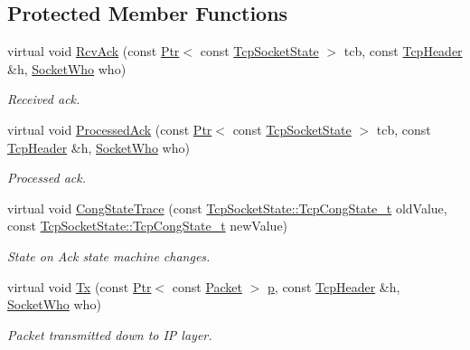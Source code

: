 \subsection*{Protected Member Functions}
\begin{DoxyCompactItemize}
\item 
virtual void \hyperlink{classTcpFastRetrTest_a43e2a765fc73bc35810a5773bf811b90}{Rcv\+Ack} (const \hyperlink{classns3_1_1Ptr}{Ptr}$<$ const \hyperlink{classns3_1_1TcpSocketState}{Tcp\+Socket\+State} $>$ tcb, const \hyperlink{classns3_1_1TcpHeader}{Tcp\+Header} \&h, \hyperlink{classns3_1_1TcpGeneralTest_a29338e6b7137cad650c2ff835713f6ee}{Socket\+Who} who)
\begin{DoxyCompactList}\small\item\em Received ack. \end{DoxyCompactList}\item 
virtual void \hyperlink{classTcpFastRetrTest_a2e4241361c77f5dad555245c5013ce18}{Processed\+Ack} (const \hyperlink{classns3_1_1Ptr}{Ptr}$<$ const \hyperlink{classns3_1_1TcpSocketState}{Tcp\+Socket\+State} $>$ tcb, const \hyperlink{classns3_1_1TcpHeader}{Tcp\+Header} \&h, \hyperlink{classns3_1_1TcpGeneralTest_a29338e6b7137cad650c2ff835713f6ee}{Socket\+Who} who)
\begin{DoxyCompactList}\small\item\em Processed ack. \end{DoxyCompactList}\item 
virtual void \hyperlink{classTcpFastRetrTest_a7f041e937cfff4c0bedc9fc984bf655d}{Cong\+State\+Trace} (const \hyperlink{classns3_1_1TcpSocketState_a6fc313945a33d48fd60cbffe0c787b19}{Tcp\+Socket\+State\+::\+Tcp\+Cong\+State\+\_\+t} old\+Value, const \hyperlink{classns3_1_1TcpSocketState_a6fc313945a33d48fd60cbffe0c787b19}{Tcp\+Socket\+State\+::\+Tcp\+Cong\+State\+\_\+t} new\+Value)
\begin{DoxyCompactList}\small\item\em State on Ack state machine changes. \end{DoxyCompactList}\item 
virtual void \hyperlink{classTcpFastRetrTest_ad6f40addb7768d3928d81afe4d9ad2d0}{Tx} (const \hyperlink{classns3_1_1Ptr}{Ptr}$<$ const \hyperlink{classns3_1_1Packet}{Packet} $>$ \hyperlink{lte__link__budget__x2__handover__measures_8m_ac9de518908a968428863f829398a4e62}{p}, const \hyperlink{classns3_1_1TcpHeader}{Tcp\+Header} \&h, \hyperlink{classns3_1_1TcpGeneralTest_a29338e6b7137cad650c2ff835713f6ee}{Socket\+Who} who)
\begin{DoxyCompactList}\small\item\em Packet transmitted down to IP layer. \end{DoxyCompactList}\item 

\end{DoxyCompactItemize}
